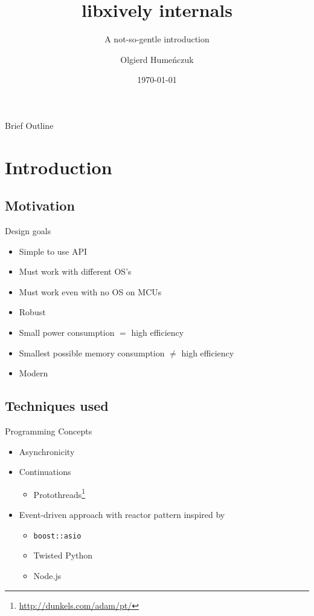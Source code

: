 \documentclass{beamer}
\title{libxively internals}
\subtitle{A not-so-gentle introduction}
\author{Olgierd Humeńczuk}
\date{\today}
\begin{document}
\begin{frame}
	\titlepage
\end{frame}

\begin{frame}{Brief Outline}
	\tableofcontents
\end{frame}

\section{Introduction}

\subsection{Motivation}

\begin{frame}{Design goals}

\begin{itemize}[<+->]
    \item Simple to use API
    \item Must work with different OS's
    \item Must work even with no OS on MCUs
    \item Robust
    \item Small power consumption $=$ high efficiency
    \item Smallest possible memory consumption $\neq$ high efficiency
    \item Modern
\end{itemize}

\end{frame}

\subsection{Techniques used}

\begin{frame}{Programming Concepts}

\begin{itemize}[<+->]
    \item Asynchronicity
    \item Continuations
    \begin{itemize}[<+->]
        \item Protothreads\footnote{\url{http://dunkels.com/adam/pt/}}
    \end{itemize}
    \item Event-driven approach with reactor pattern inspired by
    \begin{itemize}[<+->]
        \item \texttt{boost::asio}
        \item Twisted Python
        \item Node.js
    \end{itemize}
\end{itemize}

\end{frame}
\end{document}
